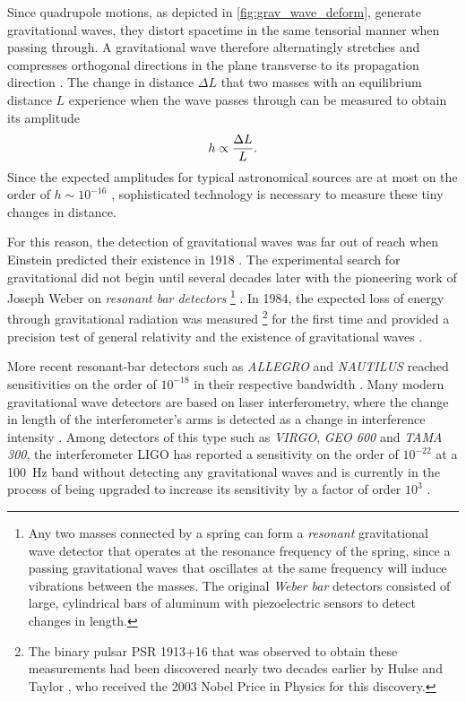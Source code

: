\documentclass[12pt,parskip=half]{scrreprt}
\begin{document}
Since quadrupole motions, as depicted in \autoref{fig:grav_wave_deform}, generate gravitational waves, they distort spacetime in the same tensorial manner when passing through. A gravitational wave therefore alternatingly stretches and compresses orthogonal directions in the plane transverse to its propagation direction \autocite{Fre}. The change in distance \(\Delta L\) that two masses with an equilibrium distance \(L\) experience when the wave passes through can be measured to obtain its amplitude
\begin{equation}
	h \propto \frac{\Delta L}{L}
	\mathpunct{.}
\end{equation}
Since the expected amplitudes for typical astronomical sources are at most on the order of \(h \sim 10^{-16}\) \autocite{Ju2000,Schutz}, sophisticated technology is necessary to measure these tiny changes in distance.

For this reason, the detection of gravitational waves was far out of reach when Einstein predicted their existence in 1918 \autocite{Einstein1918}. The experimental search for gravitational did not begin until several decades later with the pioneering work of Joseph Weber on \emph{resonant bar detectors}
\footnote{Any two masses connected by a spring can form a \emph{resonant} gravitational wave detector that operates at the resonance frequency of the spring, since a passing gravitational waves that oscillates at the same frequency will induce vibrations between the masses. The original \emph{Weber bar} detectors \autocite{Weber1960} consisted of large, cylindrical bars of aluminum with piezoelectric sensors to detect changes in length.}
\autocite{Weber1960}.
In 1984, the expected loss of energy through gravitational radiation was measured
\footnote{The binary pulsar PSR 1913+16 that was observed to obtain these measurements had been discovered nearly two decades earlier by Hulse and Taylor \autocite{HulseTaylor1975}, who received the 2003 Nobel Price in Physics for this discovery.}
for the first time and provided a precision test of general relativity and the existence of gravitational waves \autocite{Weisberg1984}.

More recent resonant-bar detectors such as \emph{ALLEGRO} and \emph{NAUTILUS} \autocite{Astone1997,Pizzella1999} reached sensitivities on the order of \(10^{-18}\) in their respective bandwidth \autocite{Ju2000}. Many modern gravitational wave detectors are based on laser interferometry, where the change in length of the interferometer's arms is detected as a change in interference intensity \autocite{Ju2000}. Among detectors of this type such as \emph{VIRGO}, \emph{GEO 600} and \emph{TAMA 300}, the interferometer LIGO has reported a sensitivity on the order of \(10^{-22}\) at a \SI{100}{\hertz} band without detecting any gravitational waves and is currently in the process of being upgraded to increase its sensitivity by a factor of order \(10^3\) \autocite{LIGO2009,LIGO2015}.
\end{document}

